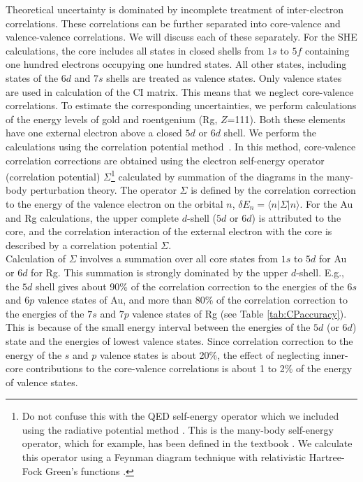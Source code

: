 \documentclass[8pt,a4paper, twoside]{report}
\begin{document}
Theoretical uncertainty is dominated by incomplete treatment of inter-electron correlations. These correlations can be further separated into core-valence and valence-valence correlations. We will discuss each of these separately. For the SHE calculations, the core includes all states in closed shells
from $1s$ to $5f$ containing one hundred electrons occupying one hundred states.
All other states, including states of the $6d$ and $7s$ shells are treated as
valence states. Only valence states are used in calculation of the CI matrix.
This means that we neglect core-valence correlations. To estimate the corresponding uncertainties, we perform calculations of the energy levels of gold and roentgenium (Rg, $Z$=111). Both these elements have one external electron above a closed $5d$ or $6d$ shell. We perform the calculations using the correlation potential method~\cite{Dzuba1988, DFSS1987_2}. In this method, core-valence correlation corrections are obtained using the electron self-energy operator (correlation potential) $\Sigma$\footnote{Do not confuse this with  the QED self-energy operator which we included using the radiative potential method \cite{FG2005}. This is the many-body self-energy operator, which for example, has been defined in the textbook \cite{LandauStatPhysPart2}. We calculate this operator using a Feynman diagram technique with relativistic Hartree-Fock Green's functions \cite{Dzuba1988}.} calculated by summation of the diagrams in the many-body perturbation theory.  The operator $\Sigma $ is defined by the correlation correction to the energy of the valence electron on the orbital $n$, $\delta E_n = \langle n | \Sigma | n \rangle$.   For the Au and Rg calculations, the upper complete $d$-shell ($5d$ or $6d$) is attributed to the core, and the correlation interaction of the external electron with the core is described by a correlation potential $\Sigma$.   \\

Calculation of $\Sigma$ involves a summation over all core states from
$1s$ to $5d$ for Au or $6d$ for Rg. This summation is strongly dominated by the upper $d$-shell. E.g., the $5d$ shell gives about 90\% of the correlation correction to the energies of the $6s$ and $6p$ valence states of Au, and more than 80\% of the correlation correction to the energies of the $7s$ and $7p$ valence states of Rg (see Table \ref{tab:CPaccuracy}). This is because of the small energy interval between the energies of
the $5d$ (or $6d$) state and the energies of lowest valence states.  Since correlation correction to the energy of the $s$ and $p$ valence states is about 20\%, the effect of neglecting inner-core contributions to the core-valence correlations is about 1 to 2\% of the energy of valence states.
\end{document}
